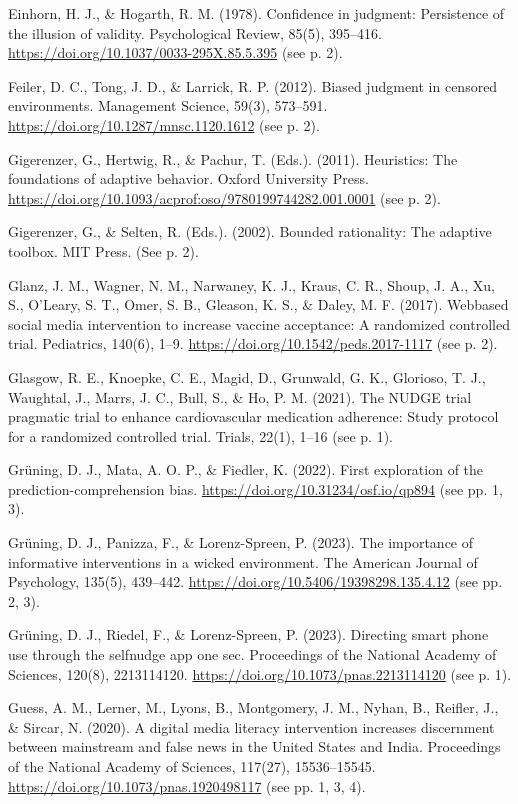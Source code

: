 \documentclass[reflection, authordate,issue]{jote-new-article}
\begin{document}
Einhorn, H. J., \& Hogarth, R. M. (1978). Confidence in judgment: Persistence of the illusion of validity. Psychological Review, 85(5), 395–416. \url{https://doi.org/10.1037/0033-295X.85.5.395} (see p. 2).

Feiler, D. C., Tong, J. D., \& Larrick, R. P. (2012). Biased judgment in censored environments. Management Science, 59(3), 573–591. \url{https://doi.org/10.1287/mnsc.1120.1612} (see p. 2).

Gigerenzer, G., Hertwig, R., \& Pachur, T. (Eds.). (2011). Heuristics: The foundations of adaptive behavior. Oxford University Press. \url{https://doi.org/10.1093/acprof:oso/9780199744282.001.0001} (see p. 2).

Gigerenzer, G., \& Selten, R. (Eds.). (2002). Bounded rationality: The adaptive toolbox. MIT Press. (See p. 2).

Glanz, J. M., Wagner, N. M., Narwaney, K. J., Kraus, C. R., Shoup, J. A., Xu, S., O’Leary, S. T., Omer, S. B., Gleason, K. S., \& Daley, M. F. (2017). Webbased social media intervention to increase vaccine acceptance: A randomized controlled trial. Pediatrics, 140(6), 1–9. \url{https://doi.org/10.1542/peds.2017-1117} (see p. 2).

Glasgow, R. E., Knoepke, C. E., Magid, D., Grunwald, G. K., Glorioso, T. J., Waughtal, J., Marrs, J. C., Bull, S., \& Ho, P. M. (2021). The NUDGE trial pragmatic trial to enhance cardiovascular medication adherence: Study protocol for a randomized controlled trial. Trials, 22(1), 1–16 (see p. 1).

Grüning, D. J., Mata, A. O. P., \& Fiedler, K. (2022). First exploration of the prediction-comprehension bias. \url{https://doi.org/10.31234/osf.io/qp894} (see pp. 1, 3).

Grüning, D. J., Panizza, F., \& Lorenz-Spreen, P. (2023). The importance of informative interventions in
a wicked environment. The American Journal of Psychology, 135(5), 439–442. \url{https://doi.org/10.5406/19398298.135.4.12} (see pp. 2, 3).

Grüning, D. J., Riedel, F., \& Lorenz-Spreen, P. (2023). Directing smart phone use through the selfnudge app one sec. Proceedings of the National Academy of Sciences, 120(8), 2213114120. \url{https://doi.org/10.1073/pnas.2213114120} (see p. 1).

Guess, A. M., Lerner, M., Lyons, B., Montgomery, J. M., Nyhan, B., Reifler, J., \& Sircar, N. (2020). A digital media literacy intervention increases discernment between mainstream and false news in the United States and India. Proceedings of the National Academy of Sciences, 117(27), 15536–15545. \url{https://doi.org/10.1073/pnas.1920498117} (see
pp. 1, 3, 4).
\end{document}
